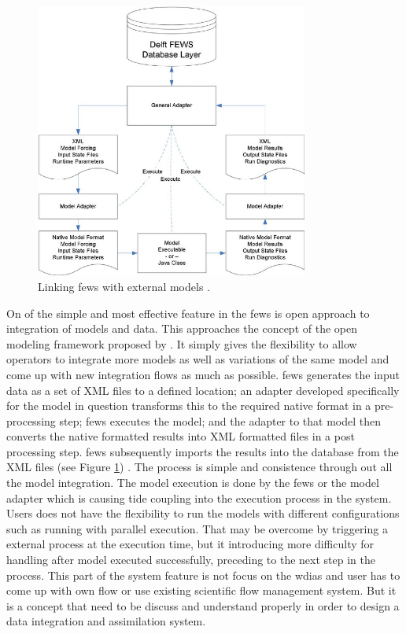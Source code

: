 \begin{figure}[htp]
    \centering
    \includegraphics[width=0.8\textwidth]{lit/fews/Linking-Delft-FEWS-with-external-models-The-fi-gure-shows-the-fl-ow-of-data-through-XML_W640.jpg}
    \caption[Linking \acrshort{fews} with external models]{Linking \acrshort{fews} with external models \cite{Werner2013TheSystem}.}
    \label{fi:fews_general_adapter}
\end{figure}
On of the simple and most effective feature in the \acrshort{fews} is open approach to integration of models and data. This approaches the concept of the open modeling framework proposed by \cite{Kokkonen2003InterfacingXML}. It simply gives the flexibility to allow operators to integrate more models as well as variations of the same model and come up with new integration flows as much as possible.
\acrshort{fews} generates the input data as a set of XML files to a defined location; an adapter developed specifically for the model in question transforms this to the required native format in a pre-processing step; \acrshort{fews} executes the model; and the adapter to that model then converts the native formatted results into XML formatted files in a post processing step. \acrshort{fews} subsequently imports the results into the database from the XML files (see Figure \ref{fi:fews_general_adapter}) \cite{Werner2013TheSystem}. The process is simple and consistence through out all the model integration. The model execution is done by the \acrshort{fews} or the model adapter which is causing tide coupling into the execution process in the system. Users does not have the flexibility to run the models with different configurations such as running with parallel execution. That may be overcome by triggering a external process at the execution time, but it introducing more difficulty for handling after model executed successfully, preceding to the next step in the process. This part of the system feature is not focus on the \acrshort{wdias} and user has to come up with own flow or use existing scientific flow management system. But it is a concept that need to be discuss and understand properly in order to design a data integration and assimilation system.

